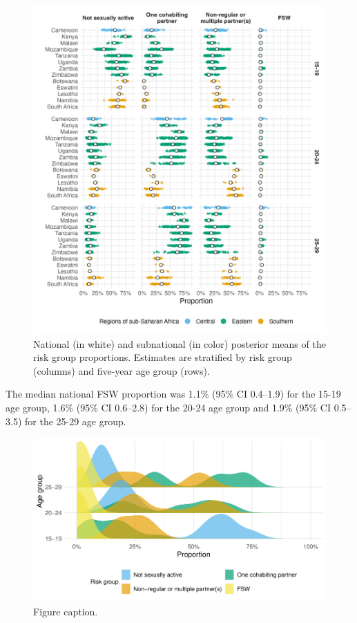 \documentclass[a4paper, nobind]{templates/ociamthesis}
\begin{document}
\begin{figure}

{\centering \includegraphics[width=0.95\linewidth]{resources/multi-agyw/20230627-144735-3da88508/depends/3p1-within-between-country-variation} 

}

\caption{National (in white) and subnational (in color) posterior means of the risk group proportions. Estimates are stratified by risk group (columns) and five-year age group (rows).}\label{fig:3p1-within-between-country-variation}
\end{figure}

The median national FSW proportion was 1.1\% (95\% CI 0.4--1.9) for the 15-19 age group, 1.6\% (95\% CI 0.6--2.8) for the 20-24 age group and 1.9\% (95\% CI 0.5--3.5) for the 25-29 age group.



\begin{figure}

{\centering \includegraphics[width=0.95\linewidth]{resources/multi-agyw/20230627-144735-3da88508/depends/age-variation} 

}

\caption{Figure caption.}\label{fig:age-variation}
\end{figure}
\end{document}
